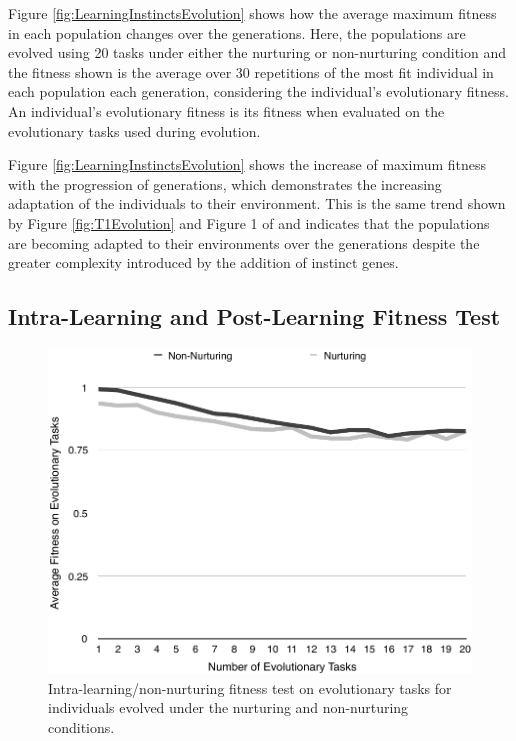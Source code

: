 \documentclass[master]{outhesis}
\begin{document}
Figure \ref{fig:LearningInstinctsEvolution} shows how the average maximum fitness in each population changes over the generations.
Here,
the populations are evolved using 20 tasks under either the nurturing or non-nurturing condition
and the fitness shown is the average over 30 repetitions of the most fit individual in each population each generation,
considering the individual's evolutionary fitness.
An individual's evolutionary fitness is its fitness when evaluated on the evolutionary tasks used during evolution.

Figure \ref{fig:LearningInstinctsEvolution} shows the increase of maximum fitness with the progression of generations,
which demonstrates the increasing adaptation of the individuals to their environment.
This is the same trend shown by Figure \ref{fig:T1Evolution} and Figure 1 of \citet{Chalmers:1990aa}
and indicates that the populations are becoming adapted to their environments over the generations despite the greater complexity introduced by the addition of instinct genes.

\subsection{Intra-Learning and Post-Learning Fitness Test}

\begin{figure}[h]
	\centering
	\includegraphics{NonNurturingFitnessTestPlot.pdf}
	\caption{Intra-learning/non-nurturing fitness test on evolutionary tasks for individuals evolved under the nurturing and non-nurturing conditions.}
	\label{fig:T1IntraLearningFitnessTest}
\end{figure}
\end{document}
